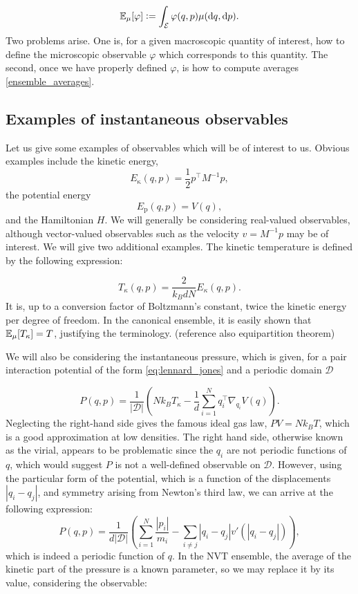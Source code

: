 \begin{equation}
    \label{eq:ensemble_averages}
    \mathbb{E}_\mu[\varphi] \mathrel{\mathop:}= \int_{\mathcal E} \varphi(q,p) \mu(\mathrm{d}q,\mathrm{d}p).
\end{equation}
Two problems arise. One is, for a given macroscopic quantity of interest, how to define the microscopic observable $\varphi$ which corresponds to this quantity. The second, once we have properly defined $\varphi$, is how to compute averages \eqref{ensemble_averages}. 


\subsection{Examples of instantaneous observables}
Let us give some examples of observables which will be of interest to us. Obvious examples include the kinetic energy,
$$ E_{\mathrm \kappa} (q,p) = \frac 12 p^\intercal M^{-1} p,$$
the potential energy
$$ E_{\mathrm p}(q,p)=V(q),$$
and the Hamiltonian $H$. We will generally be considering real-valued observables, although vector-valued observables such as the velocity $v=M^{-1}p$ may be of interest. We will give two additional examples. The kinetic temperature is defined by the following expression:

$$T_\kappa (q,p)= \frac{2}{k_BdN}E_\kappa(q,p).$$
It is, up to a conversion factor of Boltzmann's constant, twice the kinetic energy per degree of freedom. In the canonical ensemble, it is easily shown that $\mathbb{E}_\mu [T_\kappa]=T$, justifying the terminology. (reference also equipartition theorem)

We will also be considering the instantaneous pressure, which is given, for a pair interaction potential of the form \eqref{eq:lennard_jones} and a periodic domain $\mathcal D$

$$P(q,p)=\frac{1}{|\mathcal D|}\left( Nk_B T_{\kappa} -\frac1d\sum_{i=1}^N q_i^\intercal\nabla_{q_i}V(q)\right).$$
Neglecting the right-hand side gives the famous ideal gas law, $PV=Nk_BT$, which is a good approximation at low densities. The right hand side, otherwise known as the virial, appears to be problematic since the $q_i$ are not periodic functions of $q$, which would suggest $P$ is not a well-defined observable on $\mathcal D$.
However, using the particular form of the potential, which is a function of the displacements $|q_i-q_j|$, and symmetry arising from Newton's third law, we can arrive at the following expression:
$$P(q,p)=\frac1{d|\mathcal D|}\left( \sum_{i=1}^N \frac{|p_i|}{m_i}-\sum_{i \neq j}|q_i-q_j|v'(|q_i-q_j|)\right),$$
which is indeed a periodic function of $q$. In the NVT ensemble, the average of the kinetic part of the pressure is a known parameter, so we may replace it by its value, considering the observable:

